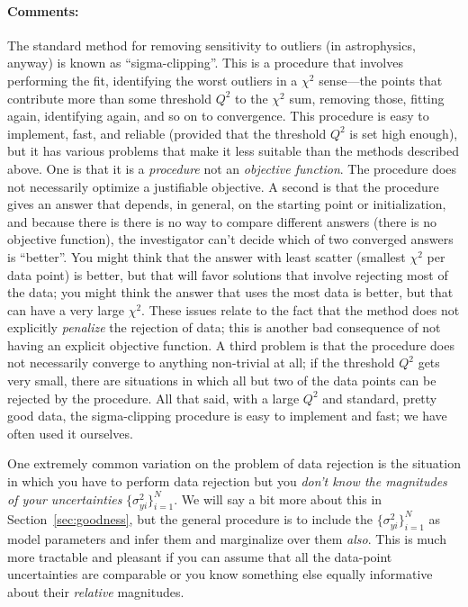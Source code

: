 \documentclass[12pt,twoside]{article}
\newcommand{\sectionname}{Section}
\newcommand{\commentsname}{Comments}
\newcounter{problem}
\newenvironment{comments}{\paragraph{\commentsname:}}{}
\newcommand{\setofall}[3]{\{{#1}\}_{{#2}}^{{#3}}}
\newcommand{\allsigmay}{\setofall{\sigma_{yi}^2}{i=1}{N}}
\begin{document}
\begin{comments}
The standard method for removing sensitivity to outliers (in
astrophysics, anyway) is known as ``sigma-clipping''.  This is a
procedure that involves performing the fit, identifying the worst
outliers in a $\chi^2$ sense---the points that contribute more than
some threshold $Q^2$ to the $\chi^2$ sum, removing those, fitting
again, identifying again, and so on to convergence.  This procedure is
easy to implement, fast, and reliable (provided that the threshold
$Q^2$ is set high enough), but it has various problems that make it
less suitable than the methods described above.  One is that it is a
\emph{procedure} not an \emph{objective function}.  The procedure does
not necessarily optimize a justifiable objective.  A second is that
the procedure gives an answer that depends, in general, on the
starting point or initialization, and because there is there is no way
to compare different answers (there is no objective function), the
investigator can't decide which of two converged answers is
``better''.  You might think that the answer with least scatter
(smallest $\chi^2$ per data point) is better, but that will favor
solutions that involve rejecting most of the data; you might think the
answer that uses the most data is better, but that can have a very
large $\chi^2$.  These issues relate to the fact that the method does
not explicitly \emph{penalize} the rejection of data; this is another
bad consequence of not having an explicit objective function.  A third
problem is that the procedure does not necessarily converge to
anything non-trivial at all; if the threshold $Q^2$ gets very small,
there are situations in which all but two of the data points can be
rejected by the procedure.  All that said, with a large $Q^2$ and
standard, pretty good data, the sigma-clipping procedure is easy to
implement and fast; we have often used it ourselves.

One extremely common variation on the problem of data rejection is the
situation in which you have to perform data rejection but you
\emph{don't know the magnitudes of your uncertainties} $\allsigmay$.
We will say a bit more about this in \sectionname~\ref{sec:goodness},
but the general procedure is to include the $\allsigmay$ as model
parameters and infer them and marginalize over them \emph{also}.  This
is much more tractable and pleasant if you can assume that all the
data-point uncertainties are comparable or you know something else
equally informative about their \emph{relative} magnitudes.


\end{comments}
\end{document}
